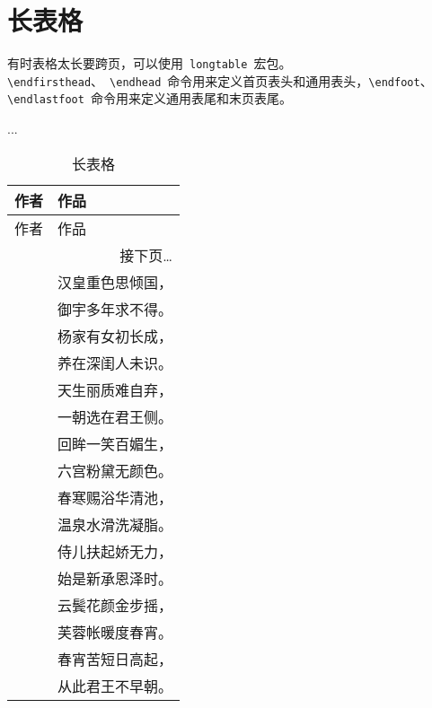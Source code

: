 \section{长表格}
有时表格太长要跨页，可以使用~\verb|longtable|~宏包\citep{Carlisle_2004}。\verb|\endfirsthead|、~\verb|\endhead|~命令用来定义首页表头和通用表头，\verb|\endfoot|、\verb|\endlastfoot|~命令用来定义通用表尾和末页表尾。
\begin{code}
\usepackage{longtable}
...
\begin{longtable}{ll}
\caption{长表格} \\
    \toprule
    作者 & 作品 \\
    \midrule
    \endfirsthead
    \midrule
    作者 & 作品 \\
    \midrule
    \endhead
    \midrule
    \multicolumn{2}{r}{接下页\dots} \\
\end{code}
\begin{code}
    \endfoot
    \bottomrule
    \endlastfoot
    白居易 & 汉皇重色思倾国，\\
    & 御宇多年求不得。\\
    & 杨家有女初长成，\\ 
    & 养在深闺人未识。\\
    & 天生丽质难自弃，\\ 
    & 一朝选在君王侧。\\
    & 回眸一笑百媚生，\\ 
    & 六宫粉黛无颜色。\\
    & 春寒赐浴华清池，\\ 
    & 温泉水滑洗凝脂。\\
    & 侍儿扶起娇无力，\\ 
    & 始是新承恩泽时。\\
    & 云鬓花颜金步摇，\\ 
    & 芙蓉帐暖度春宵。\\
    & 春宵苦短日高起，\\ 
    & 从此君王不早朝。\\
\end{longtable}
\end{code}

